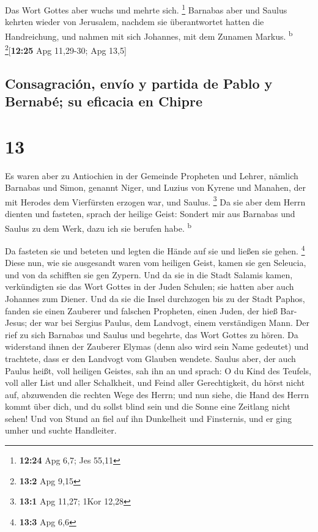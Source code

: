  Das Wort Gottes aber wuchs und mehrte sich. \footnote{\textbf{12:24}
  Apg 6,7; Jes 55,11}  Barnabas aber und Saulus kehrten
wieder von Jerusalem, nachdem sie überantwortet hatten die Handreichung,
und nahmen mit sich Johannes, mit dem Zunamen Markus.
\textsuperscript{b} \footnote{\textbf{13:2} Apg 9,15}{[}\textbf{12:25}
Apg 11,29-30; Apg 13,5{]}

\hypertarget{consagraciuxf3n-envuxedo-y-partida-de-pablo-y-bernabuxe9-su-eficacia-en-chipre}{%
\subsection{Consagración, envío y partida de Pablo y Bernabé; su
eficacia en
Chipre}\label{consagraciuxf3n-envuxedo-y-partida-de-pablo-y-bernabuxe9-su-eficacia-en-chipre}}

\hypertarget{section-12}{%
\section{13}\label{section-12}}

 Es waren aber zu Antiochien in der Gemeinde Propheten und
Lehrer, nämlich Barnabas und Simon, genannt Niger, und Luzius von Kyrene
und Manahen, der mit Herodes dem Vierfürsten erzogen war, und Saulus.
\footnote{\textbf{13:1} Apg 11,27; 1Kor 12,28}  Da sie
aber dem Herrn dienten und fasteten, sprach der heilige Geist: Sondert
mir aus Barnabas und Saulus zu dem Werk, dazu ich sie berufen habe.
\textsuperscript{b}

 Da fasteten sie und beteten und legten die Hände auf sie
und ließen sie gehen. \footnote{\textbf{13:3} Apg 6,6} 
Diese nun, wie sie ausgesandt waren vom heiligen Geist, kamen sie gen
Seleucia, und von da schifften sie gen Zypern.  Und da sie
in die Stadt Salamis kamen, verkündigten sie das Wort Gottes in der
Juden Schulen; sie hatten aber auch Johannes zum Diener. 
Und da sie die Insel durchzogen bis zu der Stadt Paphos, fanden sie
einen Zauberer und falschen Propheten, einen Juden, der hieß Bar-Jesus;
 der war bei Sergius Paulus, dem Landvogt, einem
verständigen Mann. Der rief zu sich Barnabas und Saulus und begehrte,
das Wort Gottes zu hören.  Da widerstand ihnen der
Zauberer Elymas (denn also wird sein Name gedeutet) und trachtete, dass
er den Landvogt vom Glauben wendete.  Saulus aber, der
auch Paulus heißt, voll heiligen Geistes, sah ihn an  und
sprach: O du Kind des Teufels, voll aller List und aller Schalkheit, und
Feind aller Gerechtigkeit, du hörst nicht auf, abzuwenden die rechten
Wege des Herrn;  und nun siehe, die Hand des Herrn kommt
über dich, und du sollst blind sein und die Sonne eine Zeitlang nicht
sehen! Und von Stund an fiel auf ihn Dunkelheit und Finsternis, und er
ging umher und suchte Handleiter.

